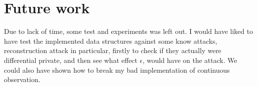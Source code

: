 \documentclass[11pt]{article}
\theoremstyle{definition}
\begin{document}
\section{Future work}
Due to lack of time, some test and experiments was left out. I would have liked to have test the implemented data structures against some know attacks, reconstruction attack in particular, firstly to check if they actually were differential private, and then see what effect $\epsilon$, would have on the attack. We could also have shown how to break my bad implementation of continuous observation.
\end{document}
